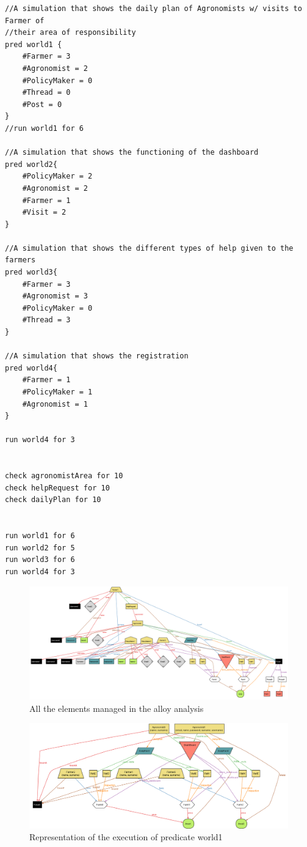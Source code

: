 \begin{lstlisting}[language=alloy]
//A simulation that shows the daily plan of Agronomists w/ visits to Farmer of
//their area of responsibility
pred world1 {
	#Farmer = 3
	#Agronomist = 2
	#PolicyMaker = 0
	#Thread = 0
	#Post = 0
}
//run world1 for 6

//A simulation that shows the functioning of the dashboard
pred world2{
	#PolicyMaker = 2
	#Agronomist = 2
	#Farmer = 1
	#Visit = 2
}

//A simulation that shows the different types of help given to the farmers
pred world3{
	#Farmer = 3
	#Agronomist = 3
	#PolicyMaker = 0
	#Thread = 3
}

//A simulation that shows the registration
pred world4{
	#Farmer = 1
	#PolicyMaker = 1
	#Agronomist = 1
}

run world4 for 3


check agronomistArea for 10
check helpRequest for 10
check dailyPlan for 10


run world1 for 6
run world2 for 5
run world3 for 6
run world4 for 3

\end{lstlisting}

\newpage

\begin{figure}[H]
	\centering
	\includegraphics[angle=90, scale=0.6]{Images/completeWorld.png}
	\caption{All the elements managed in the alloy analysis}
\end{figure}

\newpage

\begin{figure}[H]
	\centering
	\includegraphics[angle=90, scale=0.45]{Images/world1.png}
	\caption{Representation of the execution of predicate world1}
\end{figure}

